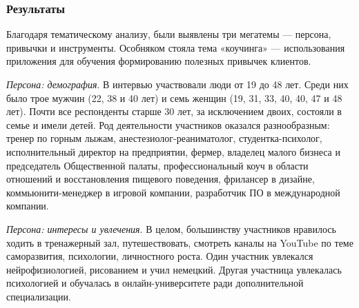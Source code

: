 \documentclass[pdflatex,sn-mathphys-num]{sn-jnl}%
\theoremstyle{thmstyleone}%
\theoremstyle{thmstyletwo}%
\theoremstyle{thmstylethree}%
\begin{document}
\subsubsection{Результаты}

Благодаря тематическому анализу, были выявлены три мегатемы — персона, привычки и инструменты. Особняком стояла тема «коучинга» — использования приложения для обучения формированию полезных привычек клиентов.

\textit{Персона: демография}. В интервью участвовали люди от 19 до 48 лет. Среди них было трое мужчин (22, 38 и 40 лет) и семь женщин (19, 31, 33, 40, 40, 47 и 48 лет). Почти все респонденты старше 30 лет, за исключением двоих, состояли в семье и имели детей. Род деятельности участников оказался разнообразным: тренер по горным лыжам, анестезиолог-реаниматолог, студентка-психолог, исполнительный директор на предприятии, фермер, владелец малого бизнеса и председатель Общественной палаты, профессиональный коуч в области отношений и восстановления пищевого поведения, фрилансер в дизайне, коммьюнити-менеджер в игровой компании, разработчик ПО в международной компании.

\textit{Персона: интересы и увлечения}. В целом, большинству участников нравилось ходить в тренажерный зал, путешествовать, смотреть каналы на YouTube по теме саморазвития, психологии, личностного роста. Один участник увлекался нейрофизиологией, рисованием и учил немецкий. Другая участница увлекалась психологией и обучалась в онлайн-университете ради дополнительной специализации. 
\end{document}
